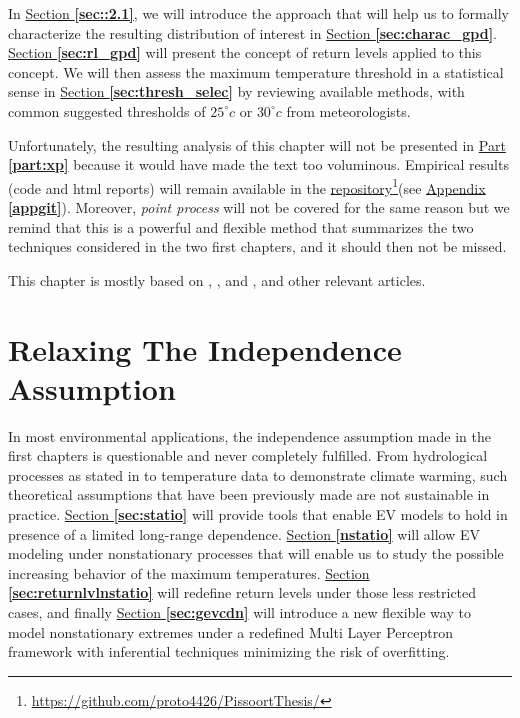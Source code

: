 \documentclass[11pt,a4paper,openany, twosided]{book}
\begin{document}
In \hyperref[sec::2.1]{Section \textbf{\ref{sec::2.1}}}, we will introduce the approach that will help us 
to formally characterize the resulting distribution of interest in \hyperref[sec:charac_gpd]{Section \textbf{\ref{sec:charac_gpd}}}. \hyperref[sec:rl_gpd]{Section \textbf{\ref{sec:rl_gpd}}} will present the concept of return levels applied to this concept. We will then assess the maximum temperature threshold in a statistical sense in \hyperref[sec:thresh_selec]{Section \textbf{\ref{sec:thresh_selec}}} by reviewing available methods, with common suggested thresholds of $25^{\circ} c$ or $30^{\circ} c$ from meteorologists.

Unfortunately, the resulting analysis of this chapter will not be presented in \hyperref[part:xp]{Part \textbf{\ref{part:xp}}} because it would have made the text too voluminous. Empirical results (code and html reports) will remain available in the \href{https://github.com/proto4426/PissoortThesis/}{repository}\footnote{\url{https://github.com/proto4426/PissoortThesis/}}(see \hyperref[appgit]{Appendix \textbf{\ref{appgit}}}). Moreover, \emph{point process} will not be covered for the same reason but we remind that this is a powerful and flexible method that summarizes the two techniques considered in the two first chapters, and it should then not be missed. 

This chapter is mostly based on \citet[chap.4 and 7]{coles_introduction_2001}, \citet[chap.4]{beirlant_statistics_2006}, \citet[chap.5]{reiss_statistical_2007} and 
\citet[chap.5]{embrechts_modelling_2011},
 and other relevant articles.

\newpage




\chapter{Relaxing The Independence Assumption}\label{sec::3}
\vspace{-1cm}
\minitoc\thispagestyle{empty}
 \vspace{1cm}
 
In most environmental applications, the independence assumption made in the first chapters is questionable and never completely fulfilled. From hydrological processes as stated in \citet{milly_climate_2008} to temperature data to demonstrate climate warming, such theoretical assumptions that have been previously made are not sustainable in practice. \hyperref[sec:statio]{Section \textbf{\ref{sec:statio}}} will provide tools that enable EV models to hold in presence of a limited long-range dependence.
\hyperref[nstatio]{Section \textbf{\ref{nstatio}}} will allow EV modeling under nonstationary processes that will enable us to study the possible increasing behavior of the maximum temperatures. \hyperref[sec:returnlvlnstatio]{Section \textbf{\ref{sec:returnlvlnstatio}}} will redefine return levels under those less restricted cases, and finally  \hyperref[sec:gevcdn]{Section \textbf{\ref{sec:gevcdn}}} will introduce a new flexible way to model nonstationary extremes under a redefined Multi Layer Perceptron framework with inferential techniques minimizing the risk of overfitting.
\end{document}

